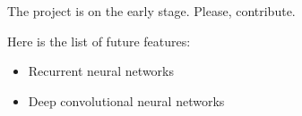The project is on the early stage. Please, contribute.

Here is the list of future features:
\begin{itemize}
  \item Recurrent neural networks
  \item Deep convolutional neural networks
\end{itemize}
